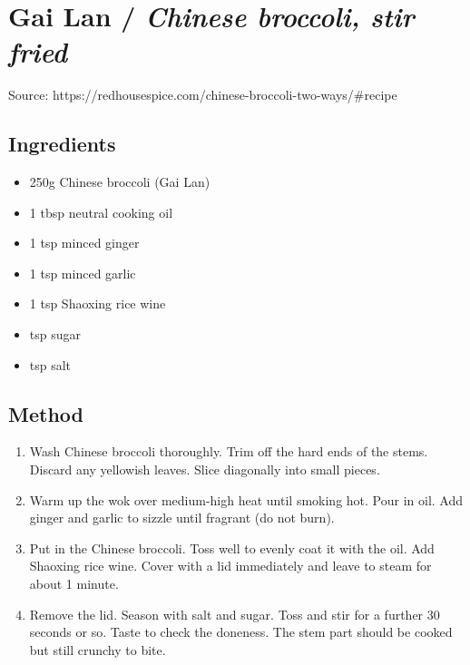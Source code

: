 \section{Gai Lan / \emph{Chinese broccoli, stir fried}}


Source: https://redhousespice.com/chinese-broccoli-two-ways/\#recipe

\subsection{Ingredients}

\begin{itemize}
    \item 250g Chinese broccoli (Gai Lan)
    \item 1 tbsp neutral cooking oil
    \item 1 tsp minced ginger
    \item 1 tsp minced garlic
    \item 1 tsp Shaoxing rice wine
    \item {} tsp sugar
    \item {} tsp salt
\end{itemize}

\subsection{Method}

\begin{enumerate}
    \item Wash Chinese broccoli thoroughly. Trim off the hard ends of the stems. Discard any yellowish leaves. Slice diagonally into small pieces.
    \item Warm up the wok over medium-high heat until smoking hot. Pour in oil. Add ginger and garlic to sizzle until fragrant (do not burn).
    \item Put in the Chinese broccoli. Toss well to evenly coat it with the oil. Add Shaoxing rice wine. Cover with a lid immediately and leave to steam for about 1 minute.
    \item Remove the lid. Season with salt and sugar. Toss and stir for a further 30 seconds or so. Taste to check the doneness. The stem part should be cooked but still crunchy to bite.
\end{enumerate}
